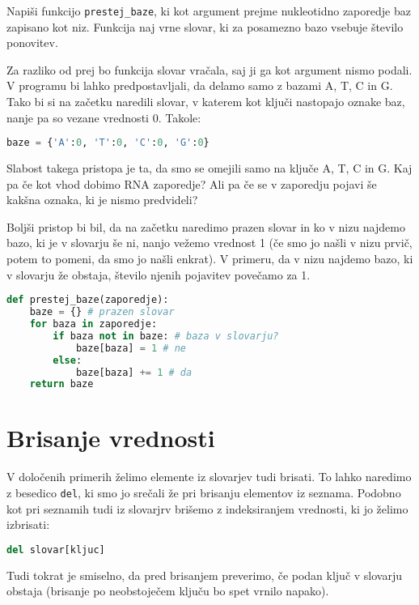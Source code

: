 \begin{zgled}
Napiši funkcijo \texttt{prestej\_baze}, ki kot argument prejme nukleotidno zaporedje baz zapisano kot niz. Funkcija naj vrne slovar, ki za posamezno bazo vsebuje število ponovitev.
\end{zgled}
\begin{resitev}
Za razliko od prej bo funkcija slovar vračala, saj ji ga kot argument nismo podali. V programu bi lahko predpostavljali, da delamo samo z bazami A, T, C in G. Tako bi si na začetku naredili slovar, v katerem kot ključi nastopajo oznake baz, nanje pa so vezane vrednosti 0. Takole:
\begin{lstlisting}[language=Python, showstringspaces=false]
baze = {'A':0, 'T':0, 'C':0, 'G':0}
\end{lstlisting}
Slabost takega pristopa je ta, da smo se omejili samo na ključe A, T, C in G. Kaj pa če kot vhod dobimo RNA zaporedje? Ali pa če se v zaporedju pojavi še kakšna oznaka, ki je nismo predvideli?

Boljši pristop bi bil, da na začetku naredimo prazen slovar in ko v nizu najdemo bazo, ki je v slovarju še ni, nanjo vežemo vrednost 1 (če smo jo našli v nizu prvič, potem to pomeni, da smo jo našli enkrat). V primeru, da v nizu najdemo bazo, ki v slovarju že obstaja, število njenih pojavitev povečamo za 1. 
\begin{lstlisting}[language=Python, showstringspaces=false]
def prestej_baze(zaporedje):
    baze = {} # prazen slovar
    for baza in zaporedje:
        if baza not in baze: # baza v slovarju? 
            baze[baza] = 1 # ne
        else:
            baze[baza] += 1 # da
    return baze
\end{lstlisting}

\end{resitev}


\section{Brisanje vrednosti}

V določenih primerih želimo elemente iz slovarjev tudi brisati. To lahko naredimo z besedico \texttt{del}, ki smo jo srečali že pri brisanju elementov iz seznama. Podobno kot pri seznamih tudi iz slovarjrv brišemo z indeksiranjem vrednosti, ki jo želimo izbrisati:
\begin{lstlisting}[language=Python, showstringspaces=false]
del slovar[kljuc]
\end{lstlisting}
Tudi tokrat je smiselno, da pred brisanjem preverimo, če podan ključ v slovarju obstaja (brisanje po neobstoječem ključu bo spet vrnilo napako).

